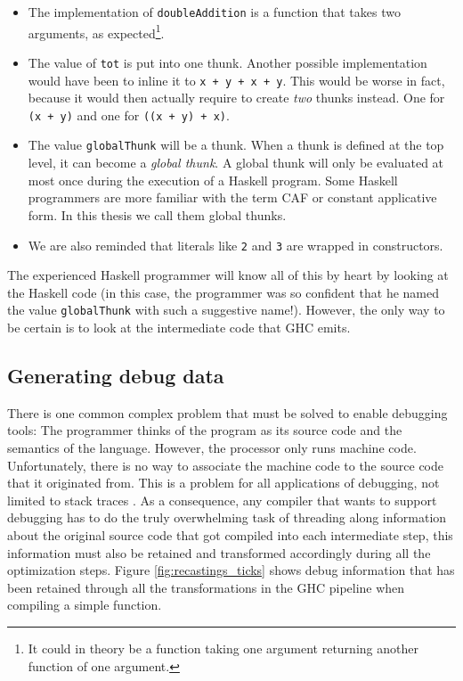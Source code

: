 \begin{itemize}
  \item
    The implementation of \texttt{doubleAddition} is a function that
    takes two arguments, as expected\footnote{It could in theory be a
      function taking one argument returning another function of one
      argument.}.
  \item
    The value of \texttt{tot} is put into one thunk. Another possible
    implementation would have been to inline it to \texttt{x + y + x +
      y}. This would be worse in fact, because it would then actually
    require to create \emph{two} thunks instead. One for \texttt{(x +
      y)} and one for \texttt{((x + y) + x)}.
  \item
    The value \texttt{globalThunk} will be a thunk. When a thunk is
    defined at the top level, it can become a \emph{global thunk}.
    A global thunk will only be evaluated at most once during the
    execution of a Haskell program. Some Haskell programmers are more
    familiar with the term CAF or constant applicative form. In this
    thesis we call them global thunks.
  \item
    We are also reminded that literals like \texttt{2} and \texttt{3}
    are wrapped in constructors.

\end{itemize}

The experienced Haskell programmer will know all of this by heart
by looking at the Haskell code (in this case, the programmer was so
confident that he named the value \texttt{globalThunk} with such a
suggestive name!). However, the only way to be certain is
to look at the intermediate code that GHC emits.


\subsection{Generating debug data}

There is one common complex problem that must be solved to enable debugging
tools: The programmer thinks of the program as its source code and the
semantics of the language. However, the processor only runs machine code.
Unfortunately, there is no way to associate the machine code to the
source code that it originated from. This is a problem for all applications of
debugging, not limited to stack traces \cite{eager2012introduction}. As a consequence, any
compiler that wants to support debugging has to do the truly overwhelming task of threading along
information about the original source code that got compiled into each
intermediate step, this information must also be retained and transformed
accordingly during all the optimization steps. Figure
\ref{fig:recastings_ticks} shows
debug information that has been retained through all the transformations in
the GHC pipeline when compiling a simple function.

